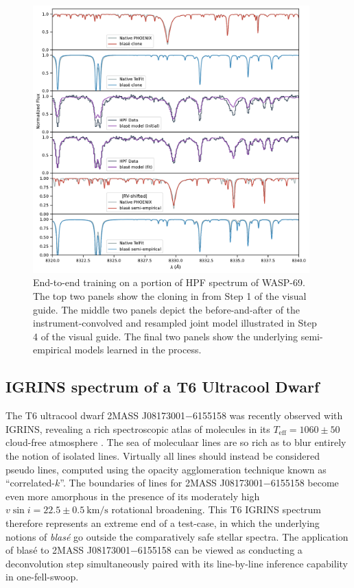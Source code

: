 \documentclass[twocolumn]{aastex631}
\begin{document}
\begin{figure}[hbt!]
    \centering
    \includegraphics[width=0.95\textwidth]{figures/WASP_69_multi.pdf}
    \caption{End-to-end training on a portion of HPF spectrum of WASP-69. The top two panels show the cloning in from Step 1 of the visual guide.  The middle two panels depict the before-and-after of the instrument-convolved and resampled joint model illustrated in Step 4 of the visual guide.  The final two panels show the underlying semi-empirical models learned in the process.}
    \label{fig_multi_panel_WASP69}
\end{figure}


\subsection{IGRINS spectrum of a T6 Ultracool Dwarf}

The T6 ultracool dwarf 2MASS J08173001$-$6155158 was recently observed with IGRINS, revealing a rich spectroscopic atlas of molecules in its $T_\mathrm{eff} = 1060 \pm 50$ cloud-free atmosphere \citep{2022MNRAS.tmp.1421T}.  The sea of moleculaar lines are so rich as to blur entirely the notion of isolated lines.  Virtually all lines should instead be considered pseudo lines, computed using the opacity agglomeration technique known as ``correlated-$k$''.  The boundaries of lines for 2MASS J08173001$-$6155158 become even more amorphous in the presence of its moderately high $v\sin{i} = 22.5\pm 0.5 ~ \text{km/s}$ \citep{2022MNRAS.tmp.1421T} rotational broadening.  This T6 IGRINS spectrum therefore represents an extreme end of a test-case, in which the underlying notions of \emph{blas\'e} go outside the comparatively safe stellar spectra.  The application of blas\'e to 2MASS J08173001$-$6155158 can be viewed as conducting a deconvolution step simultaneously paired with its line-by-line inference capability in one-fell-swoop.
\end{document}
